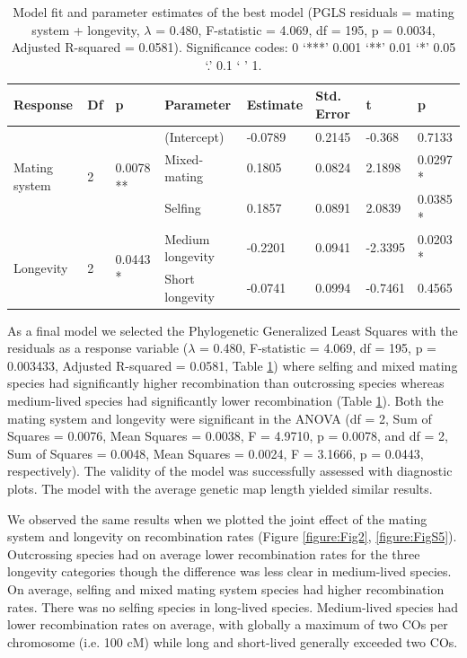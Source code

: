 \documentclass{article}
\begin{document}
\begin{table}[h!]
\centering{}
\caption{Model fit and parameter estimates of the best model (PGLS residuals = mating system + longevity, $\lambda$ = 0.480, F-statistic = 4.069, df = 195, p = 0.0034, Adjusted R-squared = 0.0581). Significance codes: 0 ‘***’ 0.001 ‘**’ 0.01 ‘*’ 0.05 ‘.’ 0.1 ‘ ’ 1.}
\begin{tabular}{llllllll}
Response                       & Df                 & p                       & Parameter        & Estimate & Std. Error & t       & p      \\ \hline
\multirow{3}{*}{Mating system} & \multirow{3}{*}{2} & \multirow{3}{*}{0.0078 **} & (Intercept)      & -0.0789  & 0.2145     & -0.368  & 0.7133 \\ \cline{4-8} 
                               &                    &                         & Mixed-mating     & 0.1805   & 0.0824     & 2.1898  & 0.0297 * \\
                               &                    &                         & Selfing          & 0.1857   & 0.0891     & 2.0839  & 0.0385 * \\ \cline{4-8} 
\multirow{2}{*}{Longevity}     & \multirow{2}{*}{2} & \multirow{2}{*}{0.0443 *} & Medium longevity & -0.2201  & 0.0941     & -2.3395 & 0.0203 * \\
                               &                    &                         & Short longevity  & -0.0741  & 0.0994     & -0.7461 & 0.4565
\end{tabular}
\label{table:table2}
\end{table}


As a final model we selected the Phylogenetic Generalized Least Squares with the residuals as a response variable ($\lambda$ = 0.480, F-statistic = 4.069, df = 195, p = 0.003433, Adjusted R-squared = 0.0581, Table \ref{table:table2}) where selfing and mixed mating species had significantly higher recombination than outcrossing species whereas medium-lived species had significantly lower recombination (Table \ref{table:table2}). Both the mating system and longevity were significant in the ANOVA (df = 2, Sum of Squares = 0.0076, Mean Squares = 0.0038, F = 4.9710, p = 0.0078, and df = 2, Sum of Squares = 0.0048, Mean Squares = 0.0024, F = 3.1666, p = 0.0443, respectively). The validity of the model was successfully assessed with diagnostic plots. The model with the average genetic map length yielded similar results.


We observed the same results when we plotted the joint effect of the mating system and longevity on recombination rates (Figure \ref{figure:Fig2}, \ref{figure:FigS5}). Outcrossing species had on average lower recombination rates for the three longevity categories though the difference was less clear in medium-lived species. On average, selfing and mixed mating system species had higher recombination rates. There was no selfing species in long-lived species. Medium-lived species had lower recombination rates on average, with globally a maximum of two COs per chromosome (i.e. 100 cM) while long and short-lived generally exceeded two COs.
\end{document}
